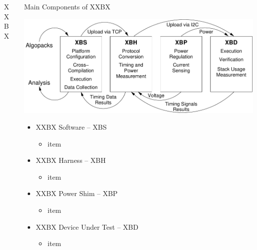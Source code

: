 \documentclass[xcolor=pdftex,dvipsnames,table,final]{beamer}
\begin{document}
\begin{frame}[fragile]{}
\begin{columns}[t, totalwidth=\textwidth]
\begin{column}{.31\linewidth}
\begin{block}{XXBX}
\begin{center}
        \end{center} 
      \end{block}
    \end{column}
\begin{column}{.675\linewidth}
   \begin{columns}%
    \begin{column}{.473\linewidth}
   
      
      \begin{block}{Main Components of XXBX}
        \begin{center}
          \includegraphics[scale=1.3]{../figures/xxbx_block}
        \end{center} 
        \begin{itemize}
          \item XXBX Software -- XBS 
          \begin{itemize}
            \item item 
          \end{itemize}
          \item XXBX Harness -- XBH 
          \begin{itemize}
            \item item 
          \end{itemize}
          \item XXBX Power Shim -- XBP
          \begin{itemize}
            \item item 
          \end{itemize}
          \item XXBX Device Under Test -- XBD
          \begin{itemize}
            \item item 
          \end{itemize}
        \end{itemize}
      \end{block}
     

\end{column}
\end{columns}
\end{column}
\end{columns}
\end{frame}
\end{document}

